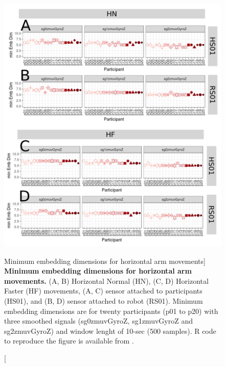 \begin{figure}
\centering
\includegraphics[width=1.0\textwidth]{cao_aHw10}
	\caption
	[Minimum embedding dimensions for horizontal arm movements]{
	{\bf Minimum embedding dimensions for horizontal arm movements.} 
		(A, B) Horizontal Normal (HN), (C, D) Horizontal Faster (HF) 
		movements,
		(A, C) sensor attached to participants (HS01), and
		(B, D) sensor attached to robot (RS01).
		Minimum embedding dimensions are for twenty participants 
		(p01 to p20) with three smoothed signals 
		(sg0zmuvGyroZ, sg1zmuvGyroZ and sg2zmuvGyroZ)
		and window lenght of 10-sec (500 samples).
		R code to reproduce the figure is available 
		from \cite{hwum2018}.
        }
    \label{fig:caoH}
\end{figure}

